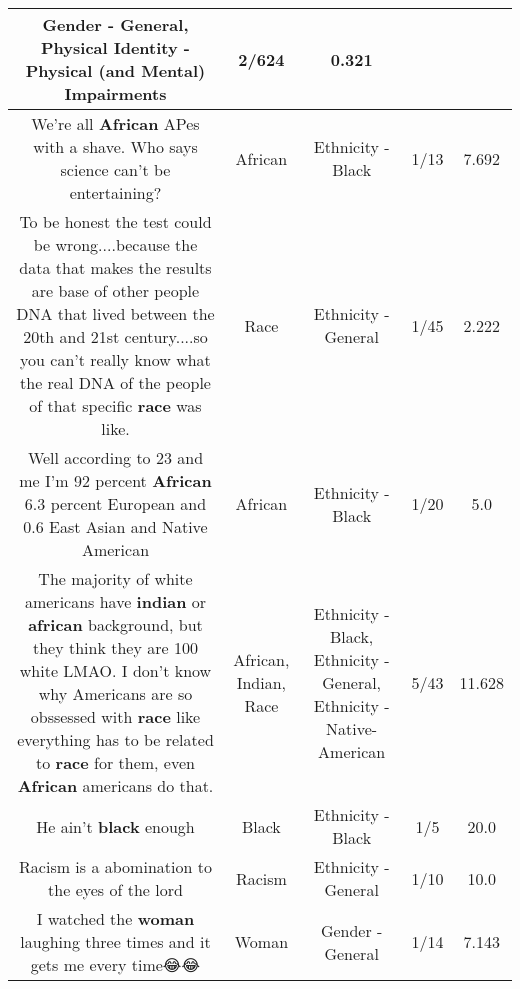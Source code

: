 \documentclass[11pt]{article}
\newlength\mylength
\begin{document}
\begin{center}
\begin{longtable}{|C{.65\mylength}|C{.30\mylength}|C{.12\mylength}|C{.12\mylength}|C{.12\mylength}|}
Gender - General, Physical Identity - Physical (and Mental) Impairments & 2/624 & 0.321 \\  \hline
  \small We're all \textbf{African} APes with a shave. Who says science can't be entertaining?\normalsize   & African & Ethnicity - Black & 1/13 & 7.692 \\  \hline
  \small To be honest the test could be wrong....because the data that makes the results are base of other people DNA that lived between the 20th and 21st century....so you can't really know what the real DNA of the people of that specific \textbf{race} was like.\normalsize   & Race & Ethnicity - General & 1/45 & 2.222 \\  \hline
  \small Well according to 23 and me I'm 92 percent \textbf{African} 6.3 percent European and 0.6 East Asian and Native American\normalsize   & African & Ethnicity - Black & 1/20 & 5.0 \\  \hline
  \small The majority of white americans have \textbf{indian} or \textbf{african} background, but they think they are 100 white LMAO. I don't know why Americans are so obssessed with \textbf{race} like everything has to be related to \textbf{race} for them, even \textbf{African} americans do that.\normalsize   & African, Indian, Race & Ethnicity - Black, Ethnicity - General, Ethnicity - Native-American & 5/43 & 11.628 \\  \hline
  \small {}  He ain't \textbf{black} enough\normalsize   & Black & Ethnicity - Black & 1/5 & 20.0 \\  \hline
  \small Racism is a abomination to the eyes of the lord\normalsize   & Racism & Ethnicity - General & 1/10 & 10.0 \\  \hline
  \small I watched the \textbf{woman} laughing three times and it gets me every time😂😂\normalsize   & Woman & Gender - General & 1/14 & 7.143 \\  \hline

\end{longtable}
\end{center}
\end{document}
